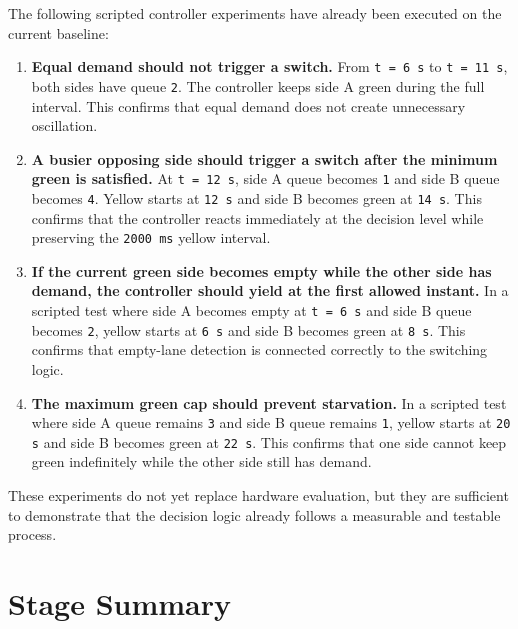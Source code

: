 \documentclass[11pt,a4paper]{article}
\begin{document}
The following scripted controller experiments have already been executed on the current baseline:

\begin{enumerate}
    \item \textbf{Equal demand should not trigger a switch.} From \texttt{t = 6 s} to \texttt{t = 11 s}, both sides have queue \texttt{2}. The controller keeps side A green during the full interval. This confirms that equal demand does not create unnecessary oscillation.
    \item \textbf{A busier opposing side should trigger a switch after the minimum green is satisfied.} At \texttt{t = 12 s}, side A queue becomes \texttt{1} and side B queue becomes \texttt{4}. Yellow starts at \texttt{12 s} and side B becomes green at \texttt{14 s}. This confirms that the controller reacts immediately at the decision level while preserving the \texttt{2000 ms} yellow interval.
    \item \textbf{If the current green side becomes empty while the other side has demand, the controller should yield at the first allowed instant.} In a scripted test where side A becomes empty at \texttt{t = 6 s} and side B queue becomes \texttt{2}, yellow starts at \texttt{6 s} and side B becomes green at \texttt{8 s}. This confirms that empty-lane detection is connected correctly to the switching logic.
    \item \textbf{The maximum green cap should prevent starvation.} In a scripted test where side A queue remains \texttt{3} and side B queue remains \texttt{1}, yellow starts at \texttt{20 s} and side B becomes green at \texttt{22 s}. This confirms that one side cannot keep green indefinitely while the other side still has demand.
\end{enumerate}

These experiments do not yet replace hardware evaluation, but they are sufficient to demonstrate that the decision logic already follows a measurable and testable process.

\section{Stage Summary}
\end{document}
